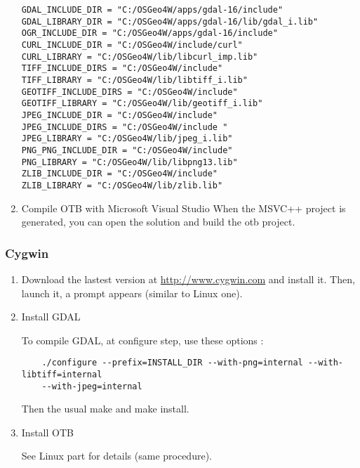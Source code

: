 \begin{enumerate}
        \texttt{GDAL\_INCLUDE\_DIR = "C:/OSGeo4W/apps/gdal-16/include"}\\
        \texttt{GDAL\_LIBRARY\_DIR = "C:/OSGeo4W/apps/gdal-16/lib/gdal\_i.lib"}\\
        \texttt{OGR\_INCLUDE\_DIR = "C:/OSGeo4W/apps/gdal-16/include"}\\
        \texttt{CURL\_INCLUDE\_DIR = "C:/OSGeo4W/include/curl"}\\
        \texttt{CURL\_LIBRARY = "C:/OSGeo4W/lib/libcurl_imp.lib"}\\
        \texttt{TIFF\_INCLUDE\_DIRS = "C:/OSGeo4W/include"}\\
        \texttt{TIFF\_LIBRARY = "C:/OSGeo4W/lib/libtiff\_i.lib"}\\
        \texttt{GEOTIFF\_INCLUDE\_DIRS = "C:/OSGeo4W/include"}\\
        \texttt{GEOTIFF\_LIBRARY = "C:/OSGeo4W/lib/geotiff\_i.lib"}\\
        \texttt{JPEG\_INCLUDE\_DIR = "C:/OSGeo4W/include" }\\
        \texttt{JPEG\_INCLUDE\_DIRS = "C:/OSGeo4W/include "}\\
        \texttt{JPEG\_LIBRARY = "C:/OSGeo4W/lib/jpeg\_i.lib"}\\
        \texttt{PNG\_PNG\_INCLUDE\_DIR = "C:/OSGeo4W/include" }\\
        \texttt{PNG\_LIBRARY = "C:/OSGeo4W/lib/libpng13.lib"}\\
        \texttt{ZLIB\_INCLUDE\_DIR = "C:/OSGeo4W/include"}\\
        \texttt{ZLIB\_LIBRARY = "C:/OSGeo4W/lib/zlib.lib"}

\item Compile OTB with Microsoft Visual Studio
  When the MSVC++ project is generated, you can open the solution and build the otb project.

\end{enumerate}


\subsubsection{Cygwin}
\begin{enumerate}

\item Download the lastest version at \url{http://www.cygwin.com} and install it.
	Then, launch it, a prompt appears (similar to Linux one).

\item Install GDAL

	To compile GDAL, at configure step, use these options :
\begin{verbatim}
	./configure --prefix=INSTALL_DIR --with-png=internal --with-libtiff=internal
	--with-jpeg=internal
\end{verbatim}
	Then the usual make and make install.


\item Install OTB

	See Linux part for details (same procedure).
\end{enumerate}

